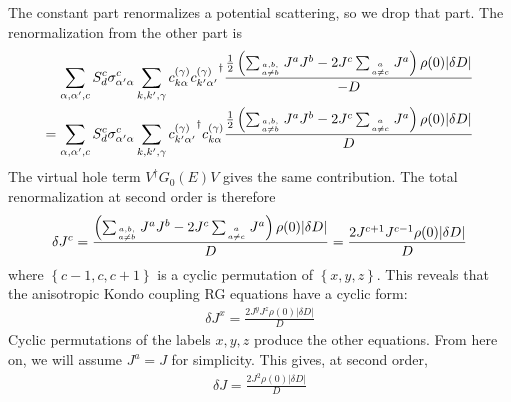 The constant part renormalizes a potential scattering, so we drop that part. The renormalization from the other part is
\begin{equation}\begin{aligned}
	\sum_{\alpha,\alpha^\prime,c} S_d^c \sigma^c_{\alpha^\prime\alpha} \sum_{k,k^\prime,\gamma}{c^{(\gamma)}_{k\alpha}} {c^{(\gamma)}_{k^\prime\alpha^\prime}}^\dagger \frac{\frac{1}{2}\left(\sum_{a,b,\atop{a\neq b}}J^a J^b - 2 J^c\sum_{a \atop{a \neq c}}J^a\right)\rho(0) |\delta D|}{-D}\\
	= \sum_{\alpha,\alpha^\prime,c} S_d^c \sigma^c_{\alpha^\prime\alpha} \sum_{k,k^\prime,\gamma}{c^{(\gamma)}_{k^\prime\alpha^\prime}}^\dagger {c^{(\gamma)}_{k\alpha}} \frac{\frac{1}{2}\left(\sum_{a,b,\atop{a\neq b}}J^a J^b - 2 J^c\sum_{a \atop{a \neq c}}J^a\right)\rho(0) |\delta D|}{D}
\end{aligned}\end{equation}
The virtual hole term \(V^\dagger G_0(E) V\) gives the same contribution. The total renormalization at second order is therefore
\begin{equation}\begin{aligned}
	\delta J^c = \frac{\left(\sum_{a,b,\atop{a\neq b}}J^a J^b - 2 J^c\sum_{a \atop{a \neq c}}J^a\right)\rho(0) |\delta D|}{D} = \frac{2J^{c+1}J^{c-1}\rho(0) |\delta D|}{D}
\end{aligned}\end{equation}
where \(\left\{c-1,c,c+1\right\}\) is a cyclic permutation of \(\left\{ x,y,z \right\} \). This reveals that the anisotropic Kondo coupling RG equations have a cyclic form:
\begin{equation}\begin{aligned}
	\delta J^x = \frac{2J^y J^z\rho(0) |\delta D|}{D}
\end{aligned}\end{equation}
Cyclic permutations of the labels \(x,y,z\) produce the other equations. From here on, we will assume \(J^a = J\) for simplicity. This gives, at second order,
\begin{equation}\begin{aligned}
	\delta J = \frac{2J^2\rho(0) |\delta D|}{D}
\end{aligned}\end{equation}

